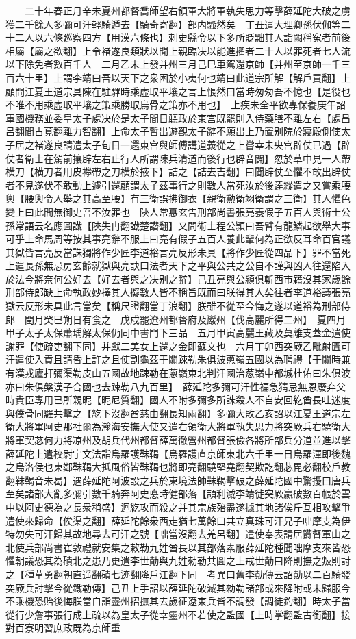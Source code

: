 　　二十年春正月辛未夏州都督喬師望右領軍大將軍執失思力等擊薛延陀大破之虜獲二千餘人多彌可汗輕騎遁去【騎奇寄翻】部内騷然矣　丁丑遣大理卿孫伏伽等二十二人以六條廵察四方【用漢六條也】刺史縣令以下多所貶黜其人詣闕稱寃者前後相屬【屬之欲翻】上令褚遂良類狀以聞上親臨决以能進擢者二十人以罪死者七人流以下除免者數百千人　二月乙未上發并州三月己巳車駕還京師【并州至京師一千三百六十里】上謂李靖曰吾以天下之衆困於小夷何也靖曰此道宗所解【解戶買翻】上顧問江夏王道宗具陳在駐驆時乘虚取平壤之言上悵然曰當時匆匆吾不憶也【是役也不唯不用乘虚取平壤之策乘勝取烏骨之策亦不用也】　上疾未全平欲專保養庚午詔軍國機務並委皇太子處决於是太子間日聼政於東宫既罷則入侍藥膳不離左右【處昌呂翻間古莧翻離力智翻】上命太子暫出遊觀太子辭不願出上乃置别院於寢殿側使太子居之褚遂良請遣太子旬日一還東宫與師傅講道義從之上嘗幸未央宫辟仗已過【辟仗者衛士在駕前攘辟左右止行人所謂陳兵清道而後行也辟音闢】忽於草中見一人帶横刀【横刀者用皮襻帶之刀横於掖下】詰之【詰去吉翻】曰聞辟仗至懼不敢出辟仗者不見遂伏不敢動上遽引還顧謂太子茲事行之則數人當死汝於後逹縱遣之又嘗乘腰輿【腰輿令人舉之其高至腰】有三衛誤拂御衣【親衛勲衛翊衛謂之三衛】其人懼色變上曰此間無御史吾不汝罪也　陜人常惪玄告刑部尚書張亮養假子五百人與術士公孫常語云名應圖䜟【陜失冉翻䜟楚譛翻】又問術士程公頴曰吾臂有龍鱗起欲舉大事可乎上命馬周等按其事亮辭不服上曰亮有假子五百人養此輩何為正欲反耳命百官議其獄皆言亮反當誅獨將作少匠李道裕言亮反形未具【將作少匠從四品下】罪不當死上遣長孫無忌房玄齡就獄與亮訣曰法者天下之平與公共之公自不謹與凶人往還陷入於法今將奈何公好去【好去者與之决别之辭】己丑亮與公潁俱斬西市籍沒其家歲餘刑部侍郎缺上命執政妙擇其人擬數人皆不稱旨既而曰朕得其人矣往者李道裕議張亮獄云反形未具此言當矣【稱尺證翻當丁浪翻】朕雖不從至今悔之遂以道裕為刑部侍郎　閏月癸巳朔日有食之　戊戍罷遼州都督府及巖州【伐高麗所得二州】　夏四月甲子太子太保蕭瑀解太保仍同中書門下三品　五月甲寅高麗王藏及莫離支蓋金遣使謝罪【使疏吏翻下同】并獻二美女上還之金即蘇文也　六月丁卯西突厥乙毗射匱可汗遣使入貢且請昏上許之且使割龜茲于闐踈勒朱俱波蔥嶺五國以為聘禮【于闐時兼有漢戎廬扞彌渠勒皮山五國故地踈勒在蔥嶺東北判汗國治葱嶺中都城杜佑曰朱俱波亦曰朱俱槃漢子合國也去踈勒八九百里】　薛延陀多彌可汗性褊急猜忌無恩廢弃父時貴臣專用已所親昵【昵尼質翻】國人不附多彌多所誅殺人不自安回紇酋長吐迷度與僕骨同羅共擊之【紇下沒翻酋慈由翻長知兩翻】多彌大敗乙亥詔以江夏王道宗左衛大將軍阿史那社爾為瀚海安撫大使又遣右領衛大將軍執失思力將突厥兵右驍衛大將軍契苾何力將凉州及胡兵代州都督薛萬徹營州都督張儉各將所部兵分道並進以擊薛延陀上遣校尉宇文法詣烏羅護靺鞨【烏羅護直京師東北六千里一日烏羅渾即後魏之烏洛侯也東鄰靺鞨大抵風俗皆靺鞨也將即亮翻驍堅堯翻契欺訖翻苾毘必翻校戶教翻靺鞨音未曷】遇薛延陀阿波設之兵於東境法帥靺鞨擊破之薛延陀國中驚擾曰唐兵至矣諸部大亂多彌引數千騎奔阿史悳時健部落【頡利滅李靖徙突厥嬴破數百帳於雲中以阿史德為之長衆稍盛】迴紇攻而殺之并其宗族殆盡遂據其地諸俟斤互相攻擊爭遣使來歸命【俟渠之翻】薛延陀餘衆西走猶七萬餘口共立真珠可汗兄子咄摩支為伊特勿失可汗歸其故地尋去可汗之號【咄當沒翻去羌呂翻】遣使奉表請居欝督軍山之北使兵部尚書崔敦禮就安集之敕勒九姓酋長以其部落素服薛延陀種聞咄摩支來皆恐懼朝議恐其為磧北之患乃更遣李世勣與九姓勑勒共圖之上戒世勣曰降則撫之叛則討之【種草勇翻朝直遥翻磧七迹翻降戶江翻下同　考異曰舊李勣傳云詔勣以二百騎發突厥兵討擊今從鐵勒傳】己丑上手詔以薛延陀破滅其勑勒諸部或來降附或未歸服今不乘機恐貽後悔朕當自詣靈州招撫其去歲征遼東兵皆不調發【調徒釣翻】時太子當從行少詹事張行成上疏以為皇太子從幸靈州不若使之監國【上時掌翻監古銜翻】接對百寮明習庶政既為京師重